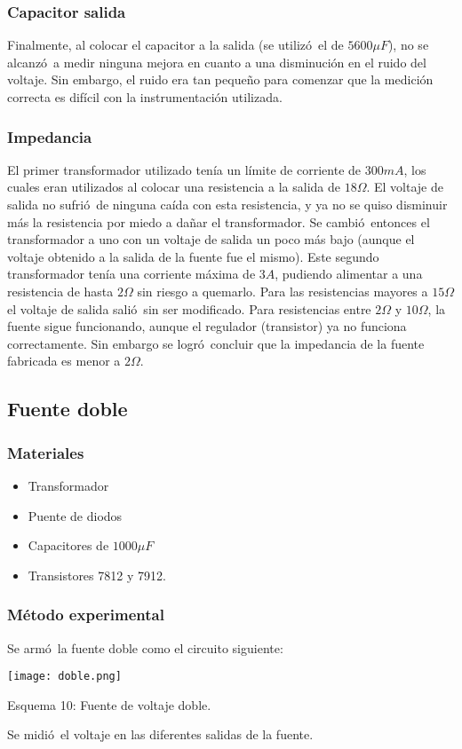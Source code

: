 \documentclass[11pt]{article}
\renewcommand{\=}[1]{\stackrel{#1}{=}} %
\theoremstyle{definition}
\theoremstyle{remark}
\begin{document}
\subsubsection*{Capacitor salida}
Finalmente, al colocar el capacitor a la salida (se utiliz\'o\ el de $5600\mu F$), no se alcanz\'o\ a medir ninguna mejora en cuanto a una disminuci\'on en el ruido del voltaje. Sin embargo, el ruido era tan peque\~no para comenzar que la medici\'on correcta es dif\'icil con la instrumentaci\'on utilizada.

\subsubsection*{Impedancia}
El primer transformador utilizado ten\'ia un l\'imite de corriente de $300mA$, los cuales eran utilizados al colocar una resistencia a la salida de $18\Omega$. El voltaje de salida no sufri\'o\ de ninguna ca\'ida con esta resistencia, y ya no se quiso disminuir m\'as la resistencia por miedo a da\~nar el transformador. Se cambi\'o\ entonces el transformador a uno con un voltaje de salida un poco m\'as bajo (aunque el voltaje obtenido a la salida de la fuente fue el mismo). Este segundo transformador ten\'ia una corriente m\'axima de $3A$, pudiendo alimentar a una resistencia de hasta $2\Omega$ sin riesgo a quemarlo. Para las resistencias mayores a $15\Omega$ el voltaje de salida sali\'o\ sin ser modificado. Para resistencias entre $2\Omega$ y $10\Omega$, la fuente sigue funcionando, aunque el regulador (transistor) ya no funciona correctamente. Sin embargo se logr\'o\ concluir que la impedancia de la fuente fabricada es menor a $2\Omega$.

\subsection{Fuente doble}
\subsubsection{Materiales}
\begin{itemize}
\item Transformador
\item Puente de diodos
\item Capacitores de $1000\mu F$
\item Transistores 7812 y 7912.
\end{itemize}
\subsubsection{M\'etodo experimental}
Se arm\'o\ la fuente doble como el circuito siguiente:
\begin{center}
\texttt{[image: doble.png]}
\end{center} 
\begin{center}
Esquema 10: Fuente de voltaje doble.
\end{center}
Se midi\'o\ el voltaje en las diferentes salidas de la fuente.
\end{document}

